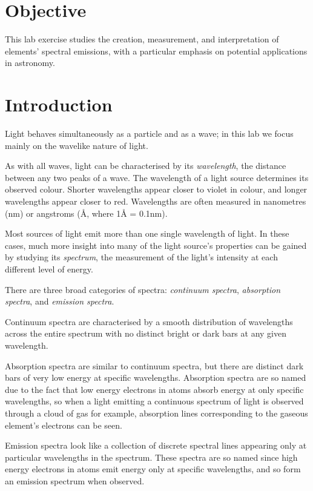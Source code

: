 \documentclass[11pt]{article}
\begin{document}
\section{Objective}
This lab exercise studies the creation, measurement, and interpretation of elements' spectral emissions, with a particular emphasis on potential applications in astronomy.


\section{Introduction}
Light behaves simultaneously as a particle and as a wave; in this lab we focus mainly on the wavelike nature of light.

As with all waves, light can be characterised by its \emph{wavelength}, the distance between any two peaks of a wave.
The wavelength of a light source determines its observed colour.
Shorter wavelengths appear closer to violet in colour, and longer wavelengths appear closer to red.
Wavelengths are often measured in nanometres (nm) or angstroms (\r{A}, where 1\r{A} = 0.1nm).

Most sources of light emit more than one single wavelength of light.
In these cases, much more insight into many of the light source's properties can be gained by studying its \emph{spectrum}, the measurement of the light's intensity at each different level of energy.

There are three broad categories of spectra: \emph{continuum spectra}, \emph{absorption spectra}, and \emph{emission spectra}.

Continuum spectra are characterised by a smooth distribution of wavelengths across the entire spectrum with no distinct bright or dark bars at any given wavelength.

Absorption spectra are similar to continuum spectra, but there are distinct dark bars of very low energy at specific wavelengths.
Absorption spectra are so named due to the fact that low energy electrons in atoms absorb energy at only specific wavelengths, so when a light emitting a continuous spectrum of light is observed through a cloud of gas for example, absorption lines corresponding to the gaseous element's electrons can be seen.

Emission spectra look like a collection of discrete spectral lines appearing only at particular wavelengths in the spectrum.
These spectra are so named since high energy electrons in atoms emit energy only at specific wavelengths, and so form an emission spectrum when observed.
\end{document}
